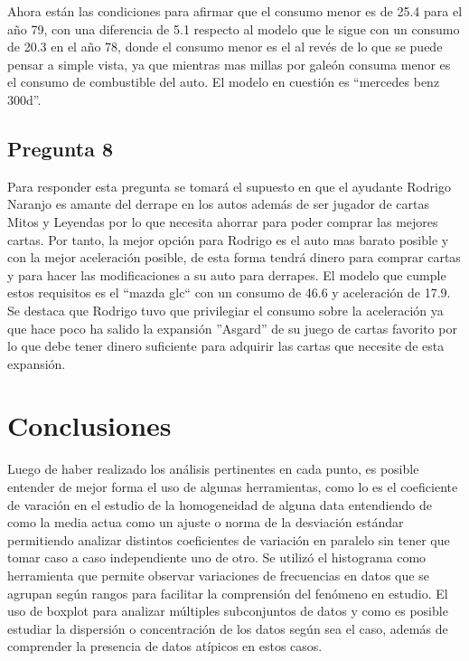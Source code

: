 \documentclass[letter,10pt]{article}
\begin{document}
Ahora están las condiciones para afirmar que el consumo menor es de 25.4 para el año 79, con una diferencia de 5.1 respecto al modelo que le sigue
con un consumo de 20.3 en el año 78, donde el consumo menor es el al revés de lo que se puede pensar a simple vista, ya que mientras mas millas por galeón consuma
menor es el consumo de combustible del auto. El modelo en cuestión es ``mercedes benz 300d''.


\subsection{Pregunta 8}
Para responder esta pregunta se tomará el supuesto en que el ayudante Rodrigo Naranjo es amante del derrape en los autos además de ser jugador de cartas Mitos y Leyendas
por lo que necesita ahorrar para poder comprar las mejores cartas. Por tanto, la mejor opción para Rodrigo es el auto mas barato posible y con la mejor aceleración posible,
de esta forma tendrá dinero para comprar cartas y para hacer las modificaciones a su auto para derrapes. El modelo que cumple
estos requisitos es el ``mazda glc`` con un consumo de 46.6 y aceleración de 17.9. Se destaca que Rodrigo tuvo que privilegiar el consumo sobre
la aceleración ya que hace poco ha salido la expansión ''Asgard'' de su juego de cartas favorito por lo que debe tener dinero suficiente para adquirir las cartas
que necesite de esta expansión.

\newpage

\section{Conclusiones}
Luego de haber realizado los análisis pertinentes en cada punto, es posible entender de mejor forma el uso de algunas herramientas, como lo es el coeficiente de varación
en el estudio de la homogeneidad de alguna data entendiendo de como la media actua como un ajuste o norma de la desviación estándar permitiendo analizar
distintos coeficientes de variación en paralelo sin tener que tomar caso a caso independiente uno de otro. Se utilizó el histograma como herramienta que permite observar
variaciones de frecuencias en datos que se agrupan según rangos para facilitar la comprensión del fenómeno en estudio.
El uso de boxplot para analizar múltiples subconjuntos de datos y como es posible estudiar la dispersión o concentración de los datos según sea el caso, además de comprender
la presencia de datos atípicos en estos casos.



%
%

\end{document}
